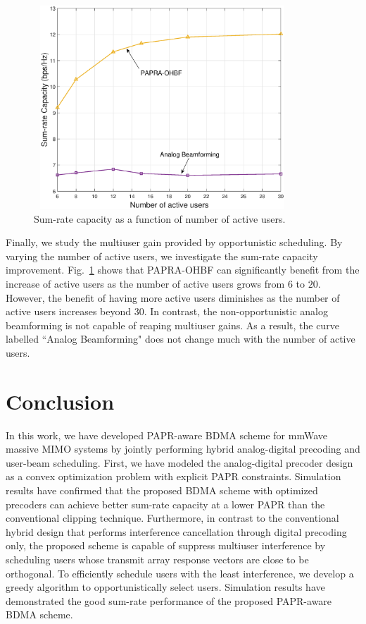 \documentclass[conference]{IEEEtran}
\begin{document}
\begin{figure}[ht]
	\begin{center}
	\includegraphics[width=3.8in,height=3in]{Figure/MultiuserGain2.eps}
	\caption{Sum-rate capacity as a function of number of active users.}\label{fig:MultiuserGain}
    \end{center}
\end{figure}


Finally, we study the multiuser gain provided by opportunistic scheduling. By varying the number of active users, we investigate the sum-rate capacity improvement. Fig.~\ref{fig:MultiuserGain} shows that PAPRA-OHBF can significantly benefit from the increase of active users as the number of active users grows from $6$ to $20$. However, the benefit of having more active users diminishes as the number of active users increases beyond $30$. In contrast, the non-opportunistic analog beamforming is not capable of reaping multiuser gains. As a result, the curve labelled ``Analog Beamforming" does not change much with the number of active users.

\section{Conclusion}
In this work, we have developed PAPR-aware BDMA scheme for mmWave massive MIMO systems by jointly performing hybrid analog-digital precoding and user-beam scheduling. First, we have modeled the analog-digital precoder design as a convex optimization problem with explicit PAPR constraints. Simulation results have confirmed that the proposed BDMA scheme with optimized precoders can achieve better sum-rate capacity at a lower PAPR than the conventional clipping technique. Furthermore, in contrast to the conventional hybrid design that performs interference cancellation through digital precoding only, the proposed scheme is capable of suppress multiuser interference by scheduling users whose transmit array response vectors are close to be orthogonal. To efficiently schedule users with the least interference, we develop a greedy algorithm to opportunistically select users. Simulation results have demonstrated the good sum-rate performance of the proposed PAPR-aware BDMA scheme.



\end{document}
